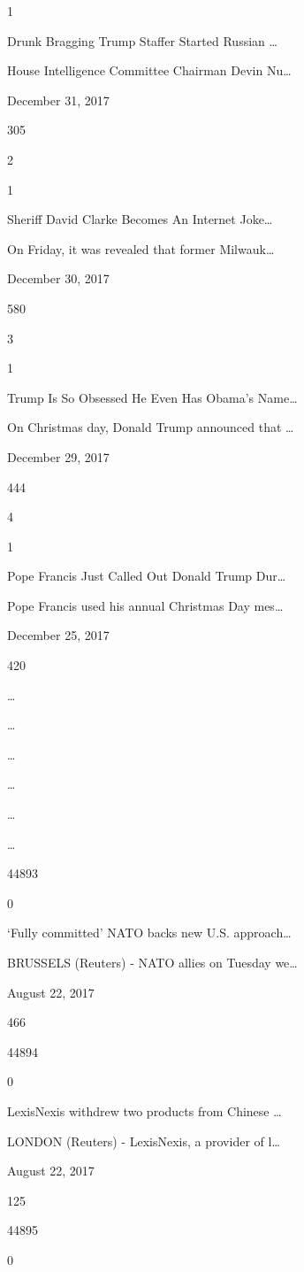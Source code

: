 \documentclass[
  11pt,
  a4paper,
]{article}
\begin{document}
1

Drunk Bragging Trump Staffer Started Russian \ldots{}

House Intelligence Committee Chairman Devin Nu\ldots{}

December 31, 2017

305

2

1

Sheriff David Clarke Becomes An Internet Joke\ldots{}

On Friday, it was revealed that former Milwauk\ldots{}

December 30, 2017

580

3

1

Trump Is So Obsessed He Even Has Obama's Name\ldots{}

On Christmas day, Donald Trump announced that \ldots{}

December 29, 2017

444

4

1

Pope Francis Just Called Out Donald Trump Dur\ldots{}

Pope Francis used his annual Christmas Day mes\ldots{}

December 25, 2017

420

\ldots{}

\ldots{}

\ldots{}

\ldots{}

\ldots{}

\ldots{}

44893

0

`Fully committed' NATO backs new U.S. approach\ldots{}

BRUSSELS (Reuters) - NATO allies on Tuesday we\ldots{}

August 22, 2017

466

44894

0

LexisNexis withdrew two products from Chinese \ldots{}

LONDON (Reuters) - LexisNexis, a provider of l\ldots{}

August 22, 2017

125

44895

0
\end{document}
